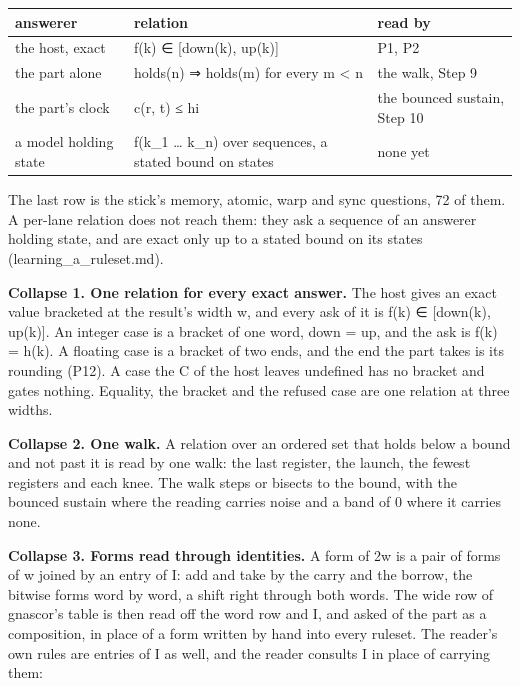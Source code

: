 {\small
\setlength{\tabcolsep}{6pt}
\begin{longtable}{>{\RaggedRight\arraybackslash}p{}>{\RaggedRight\arraybackslash}p{}>{\RaggedRight\arraybackslash}p{}}
\toprule
answerer & relation & read by \\
\midrule
\endhead
the host, exact & f(k) ∈ [down(k), up(k)] & P1, P2 \\
the part alone & holds(n) ⇒ holds(m) for every m < n & the walk, Step 9 \\
the part's clock & c(r, t) ≤ hi & the bounced sustain, Step 10 \\
a model holding state & f(k\_\allowbreak{}1 … k\_\allowbreak{}n) over sequences, a stated bound on states & none yet \\
\bottomrule
\end{longtable}
}

The last row is the stick's memory, atomic, warp and sync questions, 72 of them. A per-lane relation does not reach them: they ask a sequence of an answerer holding state, and are exact only up to a stated bound on its states (learning\_\allowbreak{}a\_\allowbreak{}ruleset.md).

\textbf{Collapse 1. One relation for every exact answer.} The host gives an exact value bracketed at the result's width w, and every ask of it is f(k) ∈ [down(k), up(k)]. An integer case is a bracket of one word, down = up, and the ask is f(k) = h(k). A floating case is a bracket of two ends, and the end the part takes is its rounding (P12). A case the C of the host leaves undefined has no bracket and gates nothing. Equality, the bracket and the refused case are one relation at three widths.

\textbf{Collapse 2. One walk.} A relation over an ordered set that holds below a bound and not past it is read by one walk: the last register, the launch, the fewest registers and each knee. The walk steps or bisects to the bound, with the bounced sustain where the reading carries noise and a band of 0 where it carries none.

\textbf{Collapse 3. Forms read through identities.} A form of 2w is a pair of forms of w joined by an entry of I: add and take by the carry and the borrow, the bitwise forms word by word, a shift right through both words. The wide row of gnascor's table is then read off the word row and I, and asked of the part as a composition, in place of a form written by hand into every ruleset. The reader's own rules are entries of I as well, and the reader consults I in place of carrying them:

